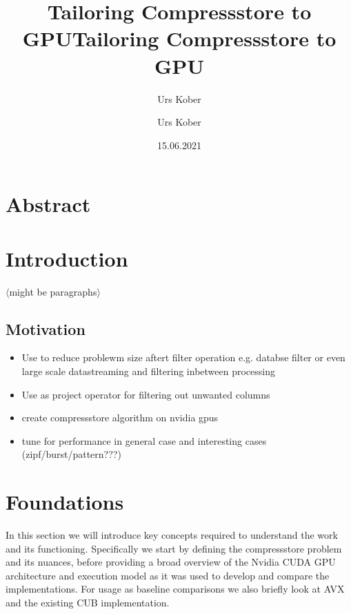 \documentclass{tudscrreprt}
\title{Tailoring Compressstore to GPU}
\author{Urs Kober}
\newcommand{\markr}[1]{\textcolor{review}{$\langle$#1$\rangle$}}
\begin{document}
	
	\date{15.06.2021}
	\title{Tailoring Compressstore to GPU}
	 
	\author{ Urs Kober
		\matriculationnumber{---}
		\placeofbirth{---}
	}
	\maketitle
	
	\section*{Abstract}
	
	\section{Introduction}
	
		\markr{might be paragraphs}
		
		\subsection{Motivation}
		
			\begin{itemize}
				\item Use to reduce problewm size aftert filter operation
					\subitem e.g. databse filter
					\subitem or even large scale datastreaming and filtering inbetween processing
				\item Use as project operator for filtering out unwanted columns
				\item create compressstore algorithm on nvidia gpus
				\item tune for performance in general case and interesting cases (zipf/burst/pattern???)
			\end{itemize}
		
	\section{Foundations}
		In this section we will introduce key concepts required to understand the work and its functioning. Specifically we start by defining the compressstore problem and its nuances, before providing a broad overview of the Nvidia CUDA GPU architecture and execution model as it was used to develop and compare the implementations. For usage as baseline comparisons we also briefly look at AVX and the existing CUB implementation.
	
\end{document}
